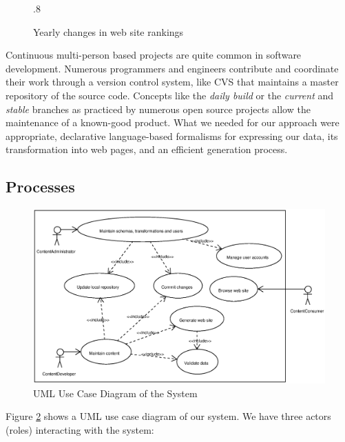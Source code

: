\documentclass[10pt]{article}
\def\epsfsize#1#2{\ifdim#1>\columnwidth\columnwidth\else#1\fi}
\begin{document}
\label{sec:design}
\begin{figure}[h!]
\begin{center}
\leavevmode
\def\epsfsize#1#2{\epsfxsize}
\epsfysize.8\vsize
{}
\end{center}
\caption{Yearly changes in web site rankings}
\label{fig:rankyear}
\end{figure}

Continuous multi-person based projects are quite
common in software development.
Numerous programmers and engineers contribute and coordinate their work
through a version control system, like {\sc CVS} that
maintains a master repository of the source code.
Concepts like the \textit{daily build} \cite{CS95b} or the
\textit{current} and \textit{stable} branches as practiced by
numerous open source projects allow the maintenance
of a known-good product.
What we needed for our approach were appropriate,
declarative language-based formalisms for expressing our data,
its transformation into web pages, and an efficient
generation process. %

\subsection{Processes}

\begin{figure}[h!]
\includegraphics[scale=0.5]{use-case-diagram}
\caption{UML Use Case Diagram of the System}
\label{fig:use-case-diagram}
\end{figure}

Figure \ref{fig:use-case-diagram} shows a {\sc UML} \cite{UML} use case diagram of our system. 
We have three actors (roles) interacting with the system:
\end{document}
